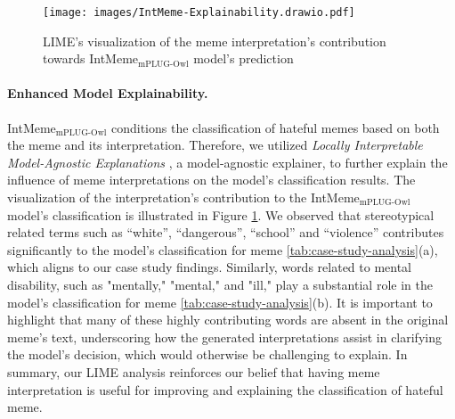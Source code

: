 \begin{figure}[t]
\centering
\texttt{[image: images/IntMeme-Explainability.drawio.pdf]}
\caption{LIME's visualization of the meme interpretation’s contribution towards IntMeme$_\text{mPLUG-Owl}$ model's prediction}
\label{fig:lime-visualization}
\end{figure}

\paragraph{Enhanced Model Explainability.} 

IntMeme$_\text{mPLUG-Owl}$ conditions the classification of hateful memes based on both the meme and its interpretation. Therefore, we utilized \textit{Locally Interpretable Model-Agnostic Explanations} \cite{ribeiro2016should}, a model-agnostic explainer, to further explain the influence of meme interpretations on the model’s classification results. The visualization of the interpretation’s contribution to the IntMeme$_\text{mPLUG-Owl}$ model’s classification is illustrated in Figure \ref{fig:lime-visualization}. We observed that stereotypical related terms such as “white”, “dangerous”, “school” and “violence” contributes significantly to the model’s classification for meme \ref{tab:case-study-analysis}(a), which aligns to our case study findings. Similarly, words related to mental disability, such as "mentally," "mental," and "ill," play a substantial role in the model's classification for meme \ref{tab:case-study-analysis}(b). It is important to highlight that many of these highly contributing words are absent in the original meme's text, underscoring how the generated interpretations assist in clarifying the model's decision, which would otherwise be challenging to explain. In summary, our LIME analysis reinforces our belief that having meme interpretation is useful for improving and explaining the classification of hateful meme.

